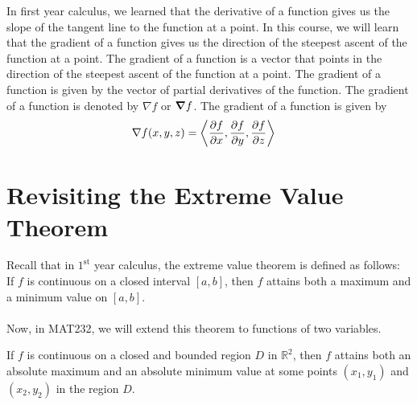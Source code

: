 \documentclass{article}
\begin{document}
In first year calculus, we learned that the derivative of a function gives us the slope of the tangent line to the function at a point. In this course, we will learn that the gradient of a function gives us the direction of the steepest ascent of the function at a point. The gradient of a function is a vector that points in the direction of the steepest ascent of the function at a point. The gradient of a function is given by the vector of partial derivatives of the function. The gradient of a function is denoted by \( \nabla f \) or \( \grad f \). The gradient of a function is given by
\begin{align*}
    \nabla f(x, y, z) &= \left \langle \pdv{f}{x}, \pdv{f}{y}, \pdv{f}{z} \right \rangle
\end{align*}

\section*{Revisiting the Extreme Value Theorem}

Recall that in $1^{\text{st}}$ year calculus, the extreme value theorem is defined as follows: \\
If $f$ is continuous on a closed interval $[a, b]$, then $f$ attains both a maximum and a minimum value on $[a, b]$. \\
\\
Now, in MAT232, we will extend this theorem to functions of two variables.

\begin{theorembox}
    If $f$ is continuous on a closed and bounded region $D$ in $\mathbb{R}^2$, then $f$ attains both an absolute maximum and an absolute minimum value at some points \( (x_1, y_1) \) and \( (x_2, y_2) \) in the region $D$.
\end{theorembox}
\end{document}
